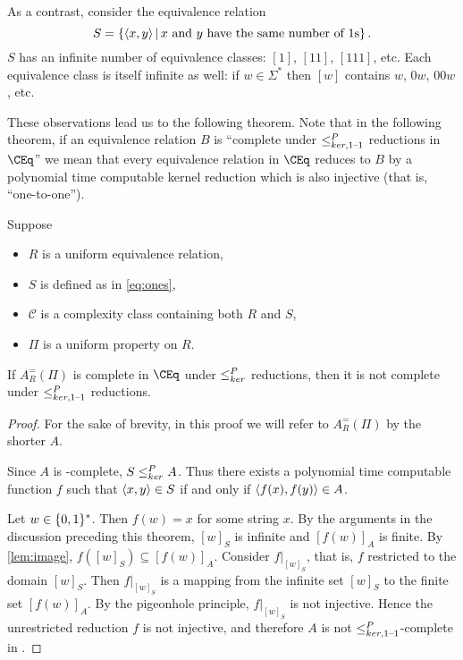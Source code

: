 As a contrast, consider the equivalence relation
\begin{equation}\label{eq:ones}
  S = \left\{\left\langle x,y\right\rangle \,\middle|\, x\text{ and }y\text{ have the same number of }1\textnormal{s}\right\}.
\end{equation}
$S$ has an infinite number of equivalence classes: $[1]$, $[11]$, $[111]$, etc.
Each equivalence class is itself infinite as well: if $w\in\Sigma^*$ then $[w]$ contains $w$, $0w$, $00w$, etc.

These observations lead us to the following theorem.
Note that in the following theorem, if an equivalence relation $B$ is ``complete under $\leq^{P}_{ker,1\text{--}1}$ reductions in $\CEq$'' we mean that every equivalence relation in $\CEq$ reduces to $B$ by a polynomial time computable kernel reduction which is also injective (that is, ``one-to-one'').

\begin{theorem}
  Suppose
  \begin{itemize}
  \item $R$ is a uniform equivalence relation,
  \item $S$ is defined as in \eqref{eq:ones},
  \item $\mathcal{C}$ is a complexity class containing both $R$ and $S$,
  \item $\Pi$ is a uniform property on $R$.
  \end{itemize}
  If $A_R^=(\Pi)$ is complete in $\CEq$ under $\leq^{P}_{ker}$ reductions, then it is not complete under $\leq^{P}_{ker,1\text{--}1}$ reductions.
\end{theorem}
\begin{proof}
  For the sake of brevity, in this proof we will refer to $A_R^=(\Pi)$ by the shorter $A$.

  Since $A$ is \CEq-complete, $S \leq^{P}_{ker} A$.
  Thus there exists a polynomial time computable function $f$ such that $\left\langle x,y\right\rangle\in S$ if and only if $\left\langle f(x),f(y)\right\rangle\in A$.

  Let $w\in\{0, 1\}^{*}$.
  Then $f(w)=x$ for some string $x$.
  By the arguments in the discussion preceding this theorem, $[w]_S$ is infinite and $[f(w)]_A$ is finite.
  By \autoref{lem:image}, $f([w]_S)\subseteq [f(w)]_A$.
  Consider $f|_{[w]_S}$, that is, $f$ restricted to the domain $[w]_S$.
  Then $f|_{[w]_S}$ is a mapping from the infinite set $[w]_S$ to the finite set $[f(w)]_A$.
  By the pigeonhole principle, $f|_{[w]_S}$ is not injective.
  Hence the unrestricted reduction $f$ is not injective, and therefore $A$ is not $\leq^{P}_{ker,1\text{--}1}$-complete in \CEq.
\end{proof}

